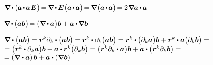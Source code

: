 ${
\boldnabla \hspace{-0.16ex} \dotp \hspace{-0.12ex} \bigl( \hspace{-0.1ex} \bm{a} \hspace{-0.2ex} \dotp \hspace{-0.2ex} \bm{a} \hspace{.1ex} \bm{E} \hspace{.1ex} \bigr) \hspace{-0.33ex}
= \hspace{-0.16ex} \boldnabla \hspace{-0.2ex} \dotp \hspace{-0.15ex}  \bm{E} \hspace{.1ex} \bigl( \hspace{-0.1ex} \bm{a} \hspace{-0.2ex} \dotp \hspace{-0.2ex} \bm{a} \bigr) \hspace{-0.33ex}
= \hspace{-0.16ex} \boldnabla \hspace{.1ex} \bigl( \hspace{-0.1ex} \bm{a} \hspace{-0.2ex} \dotp \hspace{-0.2ex} \bm{a} \bigr) \hspace{-0.33ex}
= 2 \hspace{.12ex} \boldnabla \hspace{-0.1ex} \bm{a} \hspace{-0.12ex} \dotp \hspace{-0.12ex} \bm{a}
}$

${
\boldnabla \hspace{-0.16ex} \dotp \hspace{-0.12ex} \bigl( \hspace{-0.1ex} \bm{a} \bm{b} \hspace{.05ex} \bigr) \hspace{-0.33ex}
= \hspace{-0.1ex} \bigl( \boldnabla \hspace{-0.18ex} \dotp \hspace{-0.1ex} \bm{a} \bigr) \bm{b} + \bm{a} \hspace{-0.07ex} \dotp \hspace{-0.25ex} \boldnabla \bm{b}
}$

${
\boldnabla \dotp \bigl( \bm{a} \bm{b} \bigr) = \bm{r}^k \partial_k \dotp \bigl( \bm{a} \bm{b} \bigr) = \bm{r}^k \dotp \partial_k \bigl( \bm{a} \bm{b} \bigr) = \bm{r}^k \dotp \bigl( \partial_k \bm{a} \bigr) \bm{b} + \bm{r}^k \dotp \bm{a} \bigl( \partial_k \bm{b} \bigr) = }$
\\ ${ = \bigl( \bm{r}^k \dotp \partial_k \bm{a} \bigr) \bm{b} + \bm{a} \dotp \bm{r}^k \bigl( \partial_k \bm{b} \bigr) = \bigl( \bm{r}^k \partial_k \dotp \bm{a} \bigr) \bm{b} + \bm{a} \dotp \bigl( \bm{r}^k \partial_k \bm{b} \bigr) =}$
\\ ${ = \left( \boldnabla \dotp \bm{a} \right) \bm{b} + \bm{a} \dotp \left( \boldnabla \bm{b} \right)
}$

